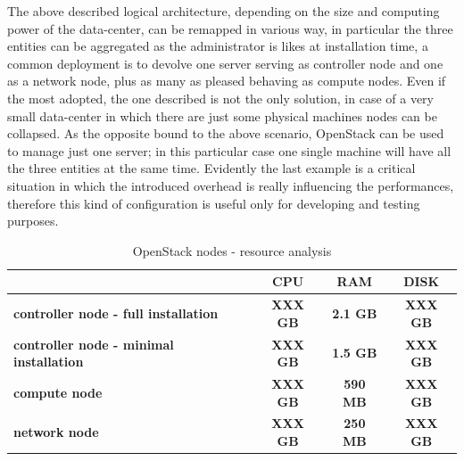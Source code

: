 The above described logical architecture, depending on the size and computing power of the data-center, can be remapped in various way, in particular the three entities can be aggregated as the administrator is likes at installation time, a common deployment is to devolve one server serving as controller node and one as a network node, plus as many as pleased behaving as compute nodes. Even if the most adopted, the one described is not the only solution, in case of a very small data-center in which there are just some physical machines nodes can be collapsed. As the opposite bound to the above scenario, OpenStack can be used to manage just one server; in this particular case one single machine will have all the three entities at the same time. Evidently the last example is a critical situation in which the introduced overhead is really influencing the performances, therefore this kind of configuration is useful only for developing and testing purposes.

\begin{table}[h]
\label{tbl:resource_usage}
\centering
\begin{tabular}{c|c|c|c|}
\cline{2-4}
\textbf{}                                                             & \textbf{CPU}       & \textbf{RAM}       & \textbf{DISK}   \\ \hline
\multicolumn{1}{|l|}{\textbf{controller node - full installation}}    & \textbf{XXX GB}    & \textbf{2.1 GB}    & \textbf{XXX GB} \\ \hline
\multicolumn{1}{|l|}{\textbf{controller node - minimal installation}} & \textbf{XXX GB}    & \textbf{1.5 GB}    & \textbf{XXX GB} \\ \hline
\multicolumn{1}{|l|}{\textbf{compute node}}                           & \textbf{XXX GB}    & \textbf{590 MB}    & \textbf{XXX GB} \\ \hline
\multicolumn{1}{|l|}{\textbf{network node}}                           & \textbf{XXX GB}    & \textbf{250 MB}    & \textbf{XXX GB} \\ \hline
\end{tabular}
\caption{OpenStack nodes - resource analysis}
\end{table}

